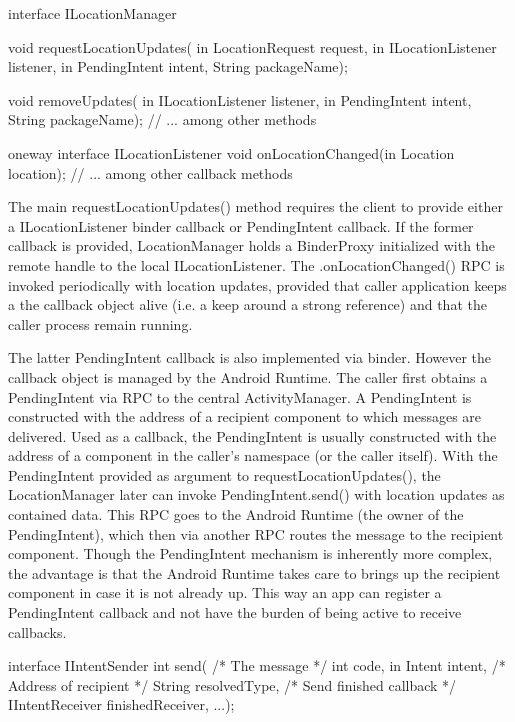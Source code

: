 \documentclass[prodmode]{acmlarge}
\begin{document}
\begin{snippet}
interface ILocationManager {
  void requestLocationUpdates(
      in LocationRequest request,
      in ILocationListener listener,
      in PendingIntent intent,
      String packageName);

  void removeUpdates(
      in ILocationListener listener,
      in PendingIntent intent,
      String packageName);
  // ... among other methods
}
\end{snippet}

\begin{snippet}
oneway interface ILocationListener {
    void onLocationChanged(in Location location);
    // ... among other callback methods
}
\end{snippet}

The main requestLocationUpdates() method requires the client to provide either a ILocationListener binder callback or PendingIntent callback. If the former callback is provided, LocationManager holds a BinderProxy initialized with the remote handle to the local ILocationListener. The .onLocationChanged() RPC is invoked periodically with location updates, provided that caller application keeps a the callback object alive (i.e. a keep around a strong reference) and that the caller process remain running.

The latter PendingIntent callback is also implemented via binder. However the callback object is managed by the Android Runtime. The caller first obtains a PendingIntent via RPC to the central ActivityManager. A PendingIntent is constructed with the address of a recipient component to which messages are delivered. Used as a callback, the PendingIntent is usually constructed with the address of a component in the caller's namespace (or the caller itself). With the PendingIntent provided as argument to requestLocationUpdates(), the LocationManager later can invoke PendingIntent.send() with location updates as contained data. This RPC goes to the Android Runtime (the owner of the PendingIntent), which then via another RPC routes the message to the recipient component. Though the PendingIntent mechanism is inherently more complex, the advantage is that the Android Runtime takes care to brings up the recipient component in case it is not already up. This way an app can register a PendingIntent callback and not have the burden of being active to receive callbacks.

\begin{snippet}
interface IIntentSender {
  int send(
    /* The message */
    int code, in Intent intent,
    /* Address of recipient */
    String resolvedType,
    /* Send finished callback */
    IIntentReceiver finishedReceiver,
    ...);
}
\end{snippet}
\end{document}
